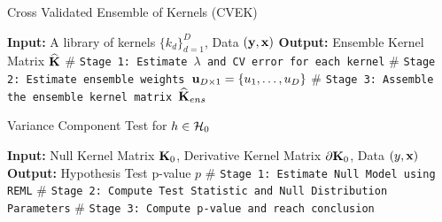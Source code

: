\documentclass[11pt]{article}
\begin{document}
\newpage
\begin{algorithm}
\caption{Cross Validated Ensemble of Kernels (CVEK)} 
\label{alg:cvke}
\begin{algorithmic}[1]
\newline
\textbf{Input:} A library of kernels $\{k_d\}_{d=1}^D$, Data $({\bf y}, {\bf x})$\newline
\textbf{Output:} Ensemble Kernel Matrix $\widehat{{\bf K}}$\newline
$\#$ \texttt{Stage 1: Estimate $\lambda$ and CV error for each kernel}
\EndFor 
\newline
$\#$ \texttt{Stage 2: Estimate ensemble weights ${\bf u}_{D \times 1} = \{u_1, \dots, u_D\}$}
\newline
$\#$ \texttt{Stage 3: Assemble the ensemble kernel matrix $\widehat{{\bf K}}_{ens}$}
\EndProcedure
\end{algorithmic}
\end{algorithm}


\begin{algorithm}
\caption{Variance Component Test for $h \in {\cal H}_0$} 
\label{alg:cvek}
\begin{algorithmic}[1]
\newline
\textbf{Input:} Null Kernel Matrix ${\bf K}_0$, Derivative Kernel Matrix $\partial {\bf K}_0$, Data $(y, {\bf x})$\newline
\textbf{Output:} Hypothesis Test p-value $p$\newline
$\#$ \texttt{Stage 1: Estimate Null Model using REML}
\newline
$\#$ \texttt{Stage 2: Compute Test Statistic and Null Distribution Parameters}
\newline
$\#$ \texttt{Stage 3: Compute p-value and reach conclusion}
\EndProcedure
\end{algorithmic}
\end{algorithm}
\end{document}
